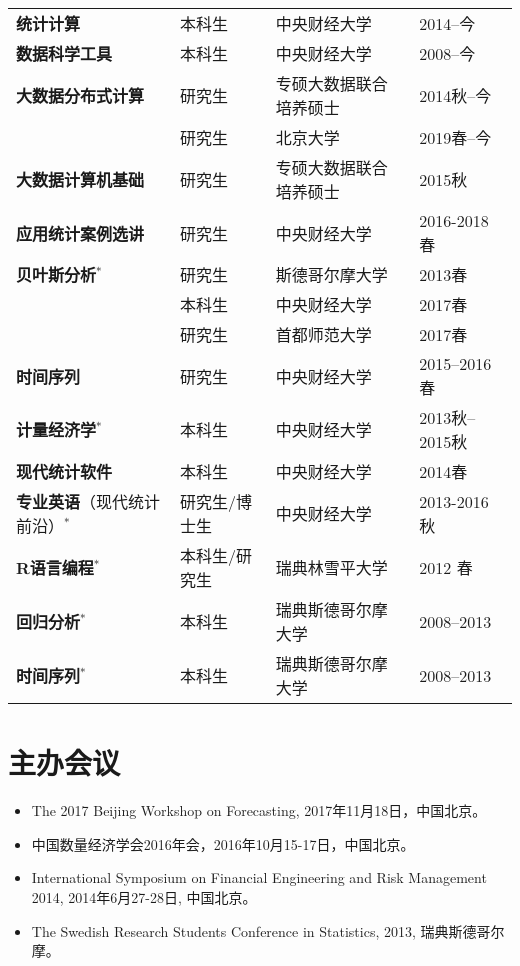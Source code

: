 \documentclass[twoside,a4paper,10pt]{amsart}
\begin{document}
\begin{tabular}{l l ll}
  \textbf{统计计算}                     & 本科生        & 中央财经大学           & 2014--今       \\
  \textbf{数据科学工具}                 & 本科生        & 中央财经大学           & 2008--今       \\
  \textbf{大数据分布式计算}             & 研究生        & 专硕大数据联合培养硕士 & 2014秋--今     \\
                                        & 研究生        & 北京大学               & 2019春--今     \\
  \textbf{大数据计算机基础}             & 研究生        & 专硕大数据联合培养硕士 & 2015秋         \\
  \textbf{应用统计案例选讲}             & 研究生        & 中央财经大学           & 2016-2018春    \\
  \textbf{贝叶斯分析}$^*$               & 研究生        & 斯德哥尔摩大学         & 2013春         \\
                                        & 本科生        & 中央财经大学           & 2017春         \\
                                        & 研究生        & 首都师范大学           & 2017春         \\
  \textbf{时间序列}                     & 研究生        & 中央财经大学           & 2015--2016春   \\
  \textbf{计量经济学}$^*$               & 本科生        & 中央财经大学           & 2013秋--2015秋 \\
  \textbf{现代统计软件}                 & 本科生        & 中央财经大学           & 2014春         \\
  \textbf{专业英语}（现代统计前沿）$^*$ & 研究生/博士生 & 中央财经大学           & 2013-2016秋    \\

  \textbf{R语言编程}$^*$&本科生/研究生&瑞典林雪平大学&  2012 春\\
  \textbf{回归分析}$^*$&本科生&瑞典斯德哥尔摩大学&2008--2013\\
  \textbf{时间序列}$^*$&本科生&瑞典斯德哥尔摩大学&2008--2013\\
\end{tabular}

\section*{主办会议}

\begin{itemize}
\item  The 2017 Beijing Workshop on Forecasting, 2017年11月18日，中国北京。
\item 中国数量经济学会2016年会，2016年10月15-17日，中国北京。

\item International Symposium on Financial Engineering and Risk Management 2014,
  2014年6月27-28日, 中国北京。

\item The Swedish Research Students Conference in Statistics, 2013, 瑞典斯德哥尔摩。
\end{itemize}
\end{document}

